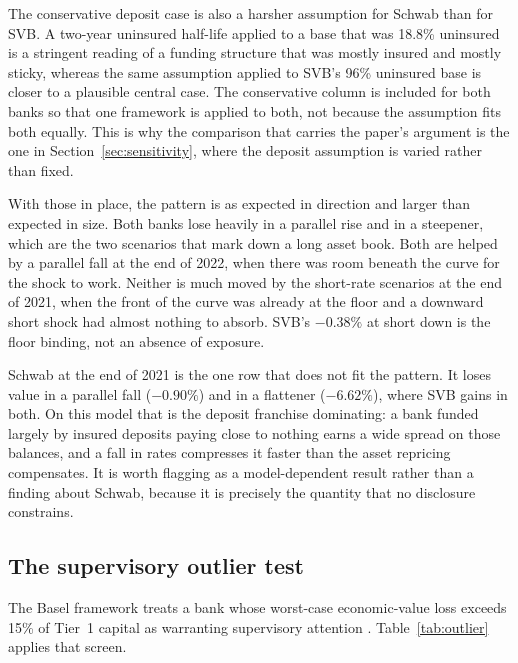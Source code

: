 The conservative deposit case is also a harsher assumption for Schwab than for SVB. A
two-year uninsured half-life applied to a base that was 18.8\% uninsured is a
stringent reading of a funding structure that was mostly insured and mostly sticky,
whereas the same assumption applied to SVB's 96\% uninsured base is closer to a
plausible central case. The conservative column is included for both banks so that
one framework is applied to both, not because the assumption fits both equally. This
is why the comparison that carries the paper's argument is the one in
Section~\ref{sec:sensitivity}, where the deposit assumption is varied rather than
fixed.

With those in place, the pattern is as expected in direction and larger than expected
in size. Both banks lose heavily in a parallel rise and in a steepener, which are the
two scenarios that mark down a long asset book. Both are helped by a parallel fall at
the end of 2022, when there was room beneath the curve for the shock to work. Neither
is much moved by the short-rate scenarios at the end of 2021, when the front of the
curve was already at the floor and a downward short shock had almost nothing to
absorb. SVB's $-0.38\%$ at short down is the floor binding, not an absence of
exposure.

Schwab at the end of 2021 is the one row that does not fit the pattern. It loses value
in a parallel fall ($-0.90\%$) and in a flattener ($-6.62\%$), where SVB gains in
both. On this model that is the deposit franchise dominating: a bank funded largely by
insured deposits paying close to nothing earns a wide spread on those balances, and a
fall in rates compresses it faster than the asset repricing compensates. It is worth
flagging as a model-dependent result rather than a finding about Schwab, because it is
precisely the quantity that no disclosure constrains.

\subsection{The supervisory outlier test}

The Basel framework treats a bank whose worst-case economic-value loss exceeds 15\% of
Tier~1 capital as warranting supervisory attention \citep{BCBS2016}.
Table~\ref{tab:outlier} applies that screen.

